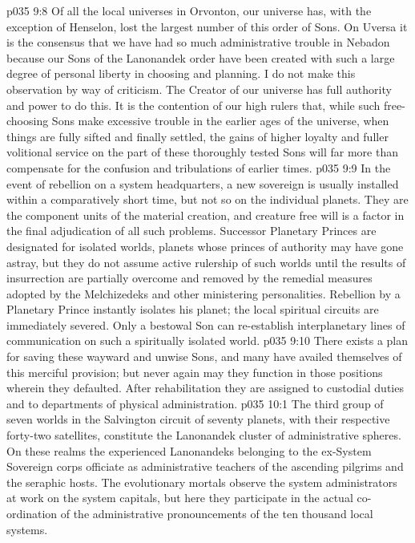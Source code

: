 \vs p035 9:8 Of all the local universes in Orvonton, our universe has, with the exception of Henselon, lost the largest number of this order of Sons. On Uversa it is the consensus that we have had so much administrative trouble in Nebadon because our Sons of the Lanonandek order have been created with such a large degree of personal liberty in choosing and planning. I do not make this observation by way of criticism. The Creator of our universe has full authority and power to do this. It is the contention of our high rulers that, while such free\hyp{}choosing Sons make excessive trouble in the earlier ages of the universe, when things are fully sifted and finally settled, the gains of higher loyalty and fuller volitional service on the part of these thoroughly tested Sons will far more than compensate for the confusion and tribulations of earlier times.
\pc \vs p035 9:9 In the event of rebellion on a system headquarters, a new sovereign is usually installed within a comparatively short time, but not so on the individual planets. They are the component units of the material creation, and creature free will is a factor in the final adjudication of all such problems. Successor Planetary Princes are designated for isolated worlds, planets whose princes of authority may have gone astray, but they do not assume active rulership of such worlds until the results of insurrection are partially overcome and removed by the remedial measures adopted by the Melchizedeks and other ministering personalities. Rebellion by a Planetary Prince instantly isolates his planet; the local spiritual circuits are immediately severed. Only a bestowal Son can re\hyp{}establish interplanetary lines of communication on such a spiritually isolated world.
\vs p035 9:10 There exists a plan for saving these wayward and unwise Sons, and many have availed themselves of this merciful provision; but never again may they function in those positions wherein they defaulted. After rehabilitation they are assigned to custodial duties and to departments of physical administration.
\vs p035 10:1 The third group of seven worlds in the Salvington circuit of seventy planets, with their respective forty\hyp{}two satellites, constitute the Lanonandek cluster of administrative spheres. On these realms the experienced Lanonandeks belonging to the ex\hyp{}System Sovereign corps officiate as administrative teachers of the ascending pilgrims and the seraphic hosts. The evolutionary mortals observe the system administrators at work on the system capitals, but here they participate in the actual co\hyp{}ordination of the administrative pronouncements of the ten thousand local systems.
